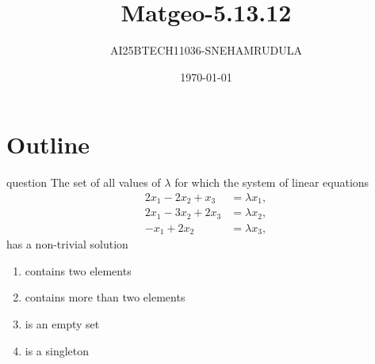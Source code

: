 \documentclass{beamer}
\title{Matgeo-5.13.12}
\author{AI25BTECH11036-SNEHAMRUDULA}
\date{\today}
\begin{document}
\begin{frame}
\titlepage
\end{frame}

\section*{Outline}
\begin{frame}{question}
   The set of all values of $\lambda$ for which the system of linear equations
\[
\begin{aligned}
2x_{1} - 2x_{2} + x_{3} &= \lambda x_{1}, \\[6pt]
2x_{1} - 3x_{2} + 2x_{3} &= \lambda x_{2}, \\[6pt]
- x_{1} + 2x_{2} &= \lambda x_{3},
\end{aligned}
\]
has a non-trivial solution
\begin{enumerate}
  \item[(a)] contains two elements
  \item[(b)] contains more than two elements
  \item[(c)] is an empty set
  \item[(d)] is a singleton
  \end{enumerate}
\end{frame}
\end{document}
